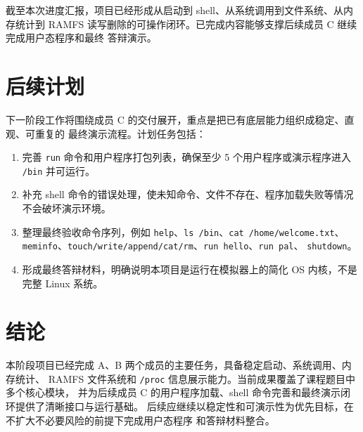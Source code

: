 \documentclass[UTF8,a4paper,zihao=-4]{ctexart}
\begin{document}
截至本次进度汇报，项目已经形成从启动到 shell、从系统调用到文件系统、从内存统计到
RAMFS 读写删除的可操作闭环。已完成内容能够支撑后续成员 C 继续完成用户态程序和最终
答辩演示。

\section{后续计划}

下一阶段工作将围绕成员 C 的交付展开，重点是把已有底层能力组织成稳定、直观、可重复的
最终演示流程。计划任务包括：
\begin{enumerate}
  \item 完善 \texttt{run} 命令和用户程序打包列表，确保至少 5 个用户程序或演示程序进入
  \texttt{/bin} 并可运行。
  \item 补充 shell 命令的错误处理，使未知命令、文件不存在、程序加载失败等情况不会破坏演示环境。
  \item 整理最终验收命令序列，例如 \texttt{help}、\texttt{ls /bin}、\texttt{cat /home/welcome.txt}、
  \texttt{meminfo}、\texttt{touch/write/append/cat/rm}、\texttt{run hello}、\texttt{run pal}、
  \texttt{shutdown}。
  \item 形成最终答辩材料，明确说明本项目是运行在模拟器上的简化 OS 内核，不是完整 Linux 系统。
\end{enumerate}

\section{结论}

本阶段项目已经完成 A、B 两个成员的主要任务，具备稳定启动、系统调用、内存统计、
RAMFS 文件系统和 \texttt{/proc} 信息展示能力。当前成果覆盖了课程题目中多个核心模块，
并为后续成员 C 的用户程序加载、shell 命令完善和最终演示闭环提供了清晰接口与运行基础。
后续应继续以稳定性和可演示性为优先目标，在不扩大不必要风险的前提下完成用户态程序
和答辩材料整合。
\end{document}
